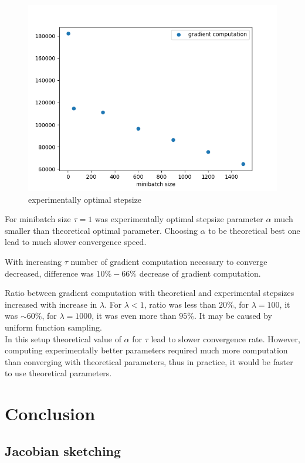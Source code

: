 \documentclass[11pt]{book}
\begin{document}
\begin{figure}[H]
	\centering
	\includegraphics[width=.7\linewidth]{optimal_stepsize.png}
	\caption{experimentally optimal stepsize}
	\label{fig:optimal stepsize}
\end{figure}



For minibatch size $\tau=1$ was experimentally optimal stepsize parameter $\alpha$ much smaller than theoretical optimal parameter. Choosing $\alpha$ to be theoretical best one lead to much slower convergence speed.

With increasing $\tau$ number of gradient computation necessary to converge decreased, difference was $10\% - 66\%$ decrease of gradient computation.

Ratio between gradient computation with theoretical and experimental stepsizes increased with increase in $\lambda$. For $\lambda <1$, ratio was less than $20\%$, for $\lambda=100$, it was $\sim 60\%$, for $\lambda=1000$, it was even more than $95\%$. It may be caused by uniform function sampling.\\

In this setup theoretical value of $\alpha$ for $\tau$ lead to slower convergence rate. However, computing experimentally better parameters required much more computation than converging with theoretical parameters, thus in practice, it would be faster to use theoretical parameters.

\chapter{Conclusion}

\section{Jacobian sketching}
\end{document}
